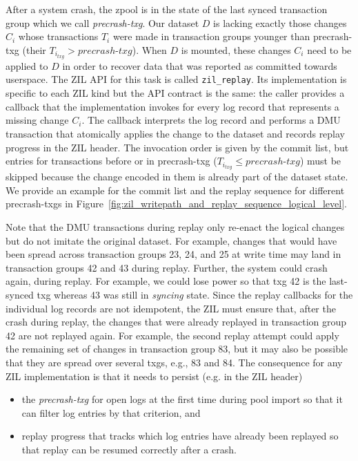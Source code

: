 \documentclass[12pt,a4paper,twoside]{book}
\begin{document}
After a system crash, the zpool is in the state of the last synced transaction group which we call \textit{precrash-txg}.
Our dataset $D$ is lacking exactly those changes $C_i$ whose transactions $T_i$ were made in transaction groups younger than precrash-txg (their $T_{i_{txg}} > precrash\text{-}txg$).
When $D$ is mounted, these changes $C_i$ need to be applied to $D$ in order to recover data that was reported as committed towards userspace.
The ZIL API for this task is called \lstinline{zil_replay}.
Its implementation is specific to each ZIL kind but the API contract is the same:
the caller provides a callback that the implementation invokes for every log record that represents a missing change $C_i$.
The callback interprets the log record and performs a DMU transaction that atomically applies the change to the dataset and records replay progress in the ZIL header.
The invocation order is given by the commit list, but entries for transactions before or in precrash-txg ($T_{i_{txg}} \le precrash\text{-}txg$) must be skipped because the change encoded in them is already part of the dataset state.
We provide an example for the commit list and the replay sequence for different precrash-txgs in Figure~\ref{fig:zil_writepath_and_replay_sequence_logical_level}.

Note that the DMU transactions during replay only re-enact the logical changes but do not imitate the original dataset.
For example, changes that would have been spread across transaction groups 23, 24, and 25 at write time may land in transaction groups 42 and 43 during replay.
Further, the system could crash again, during replay.
For example, we could lose power so that txg 42 is the last-synced txg whereas 43 was still in \textit{syncing} state.
Since the replay callbacks for the individual log records are not idempotent, the ZIL must ensure that, after the crash during replay, the changes that were already replayed in transaction group 42 are not replayed again.
For example, the second replay attempt could apply the remaining set of changes in transaction group 83, but it may also be possible that they are spread over several txgs, e.g., 83 and 84.
The consequence for any ZIL implementation is that it needs to persist (e.g. in the ZIL header)
\begin{itemize}[noitemsep]
    \item the \textit{precrash-txg} for open logs at the first time during pool import so that it can filter log entries by that criterion, and
    \item replay progress that tracks which log entries have already been replayed so that replay can be resumed correctly after a crash.
\end{itemize}
\end{document}
